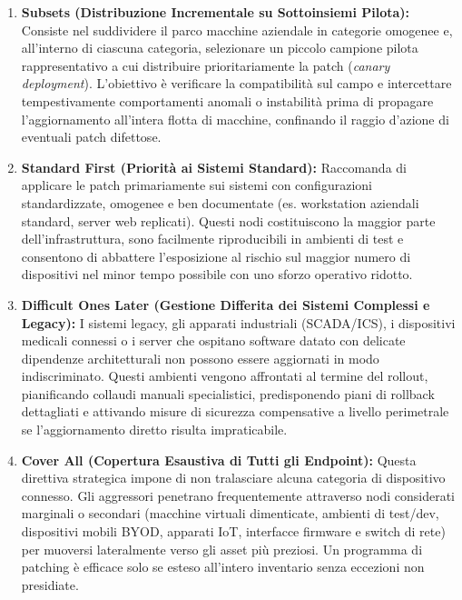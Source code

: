 \documentclass[../../main.tex]{subfiles}
\begin{document}
\begin{enumerate}
    \item \textbf{Subsets (Distribuzione Incrementale su Sottoinsiemi Pilota):} Consiste nel suddividere il parco macchine aziendale in categorie omogenee e, all'interno di ciascuna categoria, selezionare un piccolo campione pilota rappresentativo a cui distribuire prioritariamente la patch (\textit{canary deployment}). L'obiettivo è verificare la compatibilità sul campo e intercettare tempestivamente comportamenti anomali o instabilità prima di propagare l'aggiornamento all'intera flotta di macchine, confinando il raggio d'azione di eventuali patch difettose.
    
    \item \textbf{Standard First (Priorità ai Sistemi Standard):} Raccomanda di applicare le patch primariamente sui sistemi con configurazioni standardizzate, omogenee e ben documentate (es. workstation aziendali standard, server web replicati). Questi nodi costituiscono la maggior parte dell'infrastruttura, sono facilmente riproducibili in ambienti di test e consentono di abbattere l'esposizione al rischio sul maggior numero di dispositivi nel minor tempo possibile con uno sforzo operativo ridotto.
    
    \item \textbf{Difficult Ones Later (Gestione Differita dei Sistemi Complessi e Legacy):} I sistemi legacy, gli apparati industriali (SCADA/ICS), i dispositivi medicali connessi o i server che ospitano software datato con delicate dipendenze architetturali non possono essere aggiornati in modo indiscriminato. Questi ambienti vengono affrontati al termine del rollout, pianificando collaudi manuali specialistici, predisponendo piani di rollback dettagliati e attivando misure di sicurezza compensative a livello perimetrale se l'aggiornamento diretto risulta impraticabile.
    
    \item \textbf{Cover All (Copertura Esaustiva di Tutti gli Endpoint):} Questa direttiva strategica impone di non tralasciare alcuna categoria di dispositivo connesso. Gli aggressori penetrano frequentemente attraverso nodi considerati marginali o secondari (macchine virtuali dimenticate, ambienti di test/dev, dispositivi mobili BYOD, apparati IoT, interfacce firmware e switch di rete) per muoversi lateralmente verso gli asset più preziosi. Un programma di patching è efficace solo se esteso all'intero inventario senza eccezioni non presidiate.
\end{enumerate}
\end{document}
